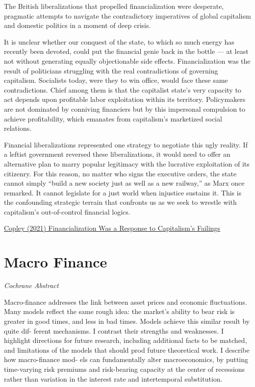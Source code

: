 \documentclass[
]{book}
\begin{document}
The British liberalizations that propelled financialization were desperate, pragmatic attempts to navigate the contradictory imperatives of global capitalism and domestic politics in a moment of deep crisis.

It is unclear whether our conquest of the state, to which so much energy has recently been devoted, could put the financial genie back in the bottle --- at least not without generating equally objectionable side effects. Financialization was the result of politicians struggling with the real contradictions of governing capitalism. Socialists today, were they to win office, would face these same contradictions. Chief among them is that the capitalist state's very capacity to act depends upon profitable labor exploitation within its territory. Policymakers are not dominated by conniving financiers but by this impersonal compulsion to achieve profitability, which emanates from capitalism's marketized social relations.

Financial liberalizations represented one strategy to negotiate this ugly reality. If a leftist government reversed these liberalizations, it would need to offer an alternative plan to marry popular legitimacy with the lucrative exploitation of its citizenry. For this reason, no matter who signs the executive orders, the state cannot simply ``build a new society just as well as a new railway,'' as Marx once remarked. It cannot legislate for a just world when injustice sustains it. This is the confounding strategic terrain that confronts us as we seek to wrestle with capitalism's out-of-control financial logics.

\href{https://jacobinmag.com/2021/12/financialization-city-london-margaret-thatcher-england}{Copley (2021) Financialization Was a Response to Capitalism's Failings}

\hypertarget{macro-finance}{%
\chapter{Macro Finance}\label{macro-finance}}

\emph{Cochrane Abstract}

Macro-finance addresses the link between asset prices and economic fluctuations.
Many models reflect the same rough idea: the market's ability to bear risk is greater
in good times, and less in bad times. Models achieve this similar result by quite dif-
ferent mechanisms. I contrast their strengths and weaknesses. I highlight directions
for future research, including additional facts to be matched, and limitations of the
models that should prod future theoretical work. I describe how macro-finance mod-
els can fundamentally alter macroeconomics, by putting time-varying risk premiums
and risk-bearing capacity at the center of recessions rather than variation in the
interest rate and intertemporal substitution.
\end{document}
